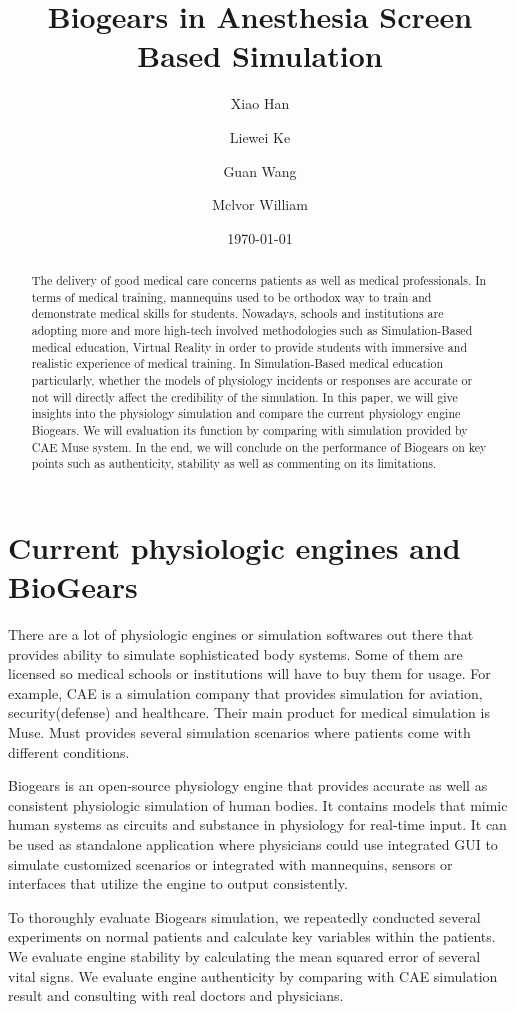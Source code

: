 \documentclass[a4paper]{article}
\title{Biogears in Anesthesia Screen Based Simulation}
\author{
  Xiao Han\\
  \and Liewei Ke
  \and Guan Wang
  \and Mclvor William
}
\date{\today}
\begin{document}
\maketitle

\begin{abstract}
The delivery of good medical care concerns patients as well as medical professionals. In terms of medical training, mannequins used to be orthodox way to train and demonstrate medical skills for students. Nowadays, schools and institutions are adopting more and more high-tech involved methodologies such as Simulation-Based medical education, Virtual Reality in order to provide students with immersive and realistic experience of medical training. In Simulation-Based medical education particularly, whether the models of physiology incidents or responses are accurate or not will directly affect the credibility of the simulation. In this paper, we will give insights into the physiology simulation and compare the current physiology engine Biogears. We will evaluation its function by comparing with simulation provided by CAE Muse system. In the end, we will conclude on the performance of Biogears on key points such as authenticity, stability as well as commenting on its limitations.
\end{abstract}

\section{Current physiologic engines and BioGears}
There are a lot of physiologic engines or simulation softwares out there that provides ability to simulate sophisticated body systems. Some of them are licensed so medical schools or institutions will have to buy them for usage. For example, CAE is a simulation company that provides simulation for aviation, security(defense) and healthcare. Their main product for medical simulation is Muse. Must provides several simulation scenarios where patients come with different conditions.

Biogears is an open-source physiology engine that provides accurate as well as consistent physiologic simulation of human bodies. It contains models that mimic human systems as circuits and substance in physiology for real-time input. It can be used as standalone application where physicians could use integrated GUI to simulate customized scenarios or integrated with mannequins, sensors or interfaces that utilize the engine to output consistently.

To thoroughly evaluate Biogears simulation, we repeatedly conducted several experiments on normal patients and calculate key variables within the patients. We evaluate engine stability by calculating the mean squared error of several vital signs. We evaluate engine authenticity by comparing with CAE simulation result and consulting with real doctors and physicians.  
\end{document}

